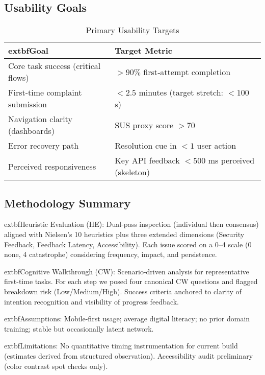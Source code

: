 \documentclass[11pt,a4paper]{article}
\begin{document}
\subsection{Usability Goals}
\begin{table}[h]
	\centering
	\renewcommand{\arraystretch}{1.15}
	\caption{Primary Usability Targets}\label{tab:usability}
	\begin{tabular}{|p{6.2cm}|p{6.2cm}|}
		\hline
			extbf{Goal} & \textbf{Target Metric} \\
		\hline
		Core task success (critical flows) & $>90\%$ first‑attempt completion \\
		\hline
		First-time complaint submission & $<2.5$ minutes (target stretch: $<100$ s) \\
		\hline
		Navigation clarity (dashboards) & SUS proxy score $>70$ \\
		\hline
		Error recovery path & Resolution cue in $<1$ user action \\
		\hline
		Perceived responsiveness & Key API feedback $<500$ ms perceived (skeleton) \\
		\hline
	\end{tabular}
\end{table}

\subsection{Methodology Summary}
	extbf{Heuristic Evaluation (HE):} Dual-pass inspection (individual then consensus) aligned with Nielsen's 10 heuristics plus three extended dimensions (Security Feedback, Feedback Latency, Accessibility). Each issue scored on a 0--4 scale (0 none, 4 catastrophe) considering frequency, impact, and persistence.

	extbf{Cognitive Walkthrough (CW):} Scenario-driven analysis for representative first-time tasks. For each step we posed four canonical CW questions and flagged breakdown risk (Low/Medium/High). Success criteria anchored to clarity of intention recognition and visibility of progress feedback.

	extbf{Assumptions:} Mobile-first usage; average digital literacy; no prior domain training; stable but occasionally latent network.

	extbf{Limitations:} No quantitative timing instrumentation for current build (estimates derived from structured observation). Accessibility audit preliminary (color contrast spot checks only).

\end{document}
